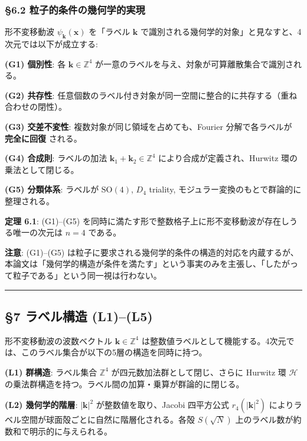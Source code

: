\documentclass[
  a4paper,11pt]{ltjsarticle}
\theoremstyle{definition}
\theoremstyle{remark}
\begin{document}
\subsubsection{§6.2
粒子的条件の幾何学的実現}\label{ux7c92ux5b50ux7684ux6761ux4ef6ux306eux5e7eux4f55ux5b66ux7684ux5b9fux73fe}

形不変移動波 \(\psi_{\mathbf{k}}(\mathbf{x})\) を「ラベル \(\mathbf{k}\)
で識別される幾何学的対象」と見なすと、4次元では以下が成立する:

\textbf{(G1) 個別性}: 各 \(\mathbf{k} \in \mathbb{Z}^4\)
が一意のラベルを与え、対象が可算離散集合で識別される。

\textbf{(G2) 共存性}:
任意個数のラベル付き対象が同一空間に整合的に共存する（重ね合わせの閉性）。

\textbf{(G3) 交差不変性}: 複数対象が同じ領域を占めても、Fourier
分解で各ラベルが \textbf{完全に回復} される。

\textbf{(G4) 合成則}: ラベルの加法
\(\mathbf{k}_1 + \mathbf{k}_2 \in \mathbb{Z}^4\)
により合成が定義され、Hurwitz 環の乗法として閉じる。

\textbf{(G5) 分類体系}: ラベルが \(\mathrm{SO}(4)\), \(D_4\) triality,
モジュラー変換のもとで群論的に整理される。

\textbf{定理 6.1}: (G1)--(G5)
を同時に満たす形で整数格子上に形不変移動波が存在しうる唯一の次元は
\(n = 4\) である。

\textbf{注意}: (G1)--(G5)
は粒子に要求される幾何学的条件の構造的対応を内蔵するが、本論文は「幾何学的構造が条件を満たす」という事実のみを主張し、「したがって粒子である」という同一視は行わない。

\begin{center}\rule{0.5\linewidth}{0.5pt}\end{center}

\subsection{§7 ラベル構造
(L1)--(L5)}\label{ux30e9ux30d9ux30ebux69cbux9020-l1l5}

形不変移動波の波数ベクトル \(\mathbf{k} \in \mathbb{Z}^4\)
は整数値ラベルとして機能する。4次元では、このラベル集合が以下の5層の構造を同時に持つ。

\textbf{(L1) 群構造}: ラベル集合 \(\mathbb{Z}^4\)
が四元数加法群として閉じ、さらに Hurwitz 環 \(\mathcal{H}\)
の乗法群構造を持つ。ラベル間の加算・乗算が群論的に閉じる。

\textbf{(L2) 幾何学的階層}: \(|\mathbf{k}|^2\) が整数値を取り、Jacobi
四平方公式 \(r_4(|\mathbf{k}|^2)\)
によりラベル空間が球面殻ごとに自然に階層化される。各殻 \(S(\sqrt{N})\)
上のラベル数が約数和で明示的に与えられる。
\end{document}
